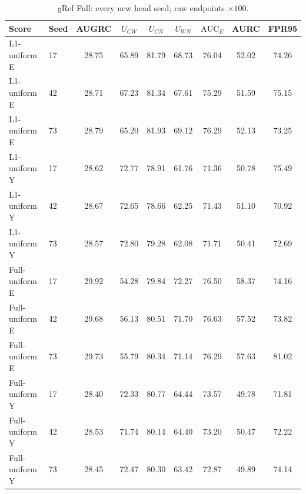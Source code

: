 \begin{table}[t]
\centering\footnotesize
\setlength{\tabcolsep}{3pt}
\renewcommand{\arraystretch}{1.15}
\caption{gRef Full: every new head seed; raw endpoints $\times100$.}\label{tab:coverage_seeds_gref_full}
\begin{tabular}{@{}llccccccc@{}}\toprule
Score & Seed & AUGRC & $U_{CW}$ & $U_{CN}$ & $U_{WN}$ & $\mathrm{AUC}_E$ & AURC & FPR95\\\midrule
L1-uniform E & 17 & 28.75 & 65.89 & 81.79 & 68.73 & 76.04 & 52.02 & 74.26\\
L1-uniform E & 42 & 28.71 & 67.23 & 81.34 & 67.61 & 75.29 & 51.59 & 75.15\\
L1-uniform E & 73 & 28.79 & 65.20 & 81.93 & 69.12 & 76.29 & 52.13 & 73.25\\
L1-uniform Y & 17 & 28.62 & 72.77 & 78.91 & 61.76 & 71.36 & 50.78 & 75.49\\
L1-uniform Y & 42 & 28.67 & 72.65 & 78.66 & 62.25 & 71.43 & 51.10 & 70.92\\
L1-uniform Y & 73 & 28.57 & 72.80 & 79.28 & 62.08 & 71.71 & 50.41 & 72.69\\
Full-uniform E & 17 & 29.92 & 54.28 & 79.84 & 72.27 & 76.50 & 58.37 & 74.16\\
Full-uniform E & 42 & 29.68 & 56.13 & 80.51 & 71.70 & 76.63 & 57.52 & 73.82\\
Full-uniform E & 73 & 29.73 & 55.79 & 80.34 & 71.14 & 76.29 & 57.63 & 81.02\\
Full-uniform Y & 17 & 28.40 & 72.33 & 80.77 & 64.44 & 73.57 & 49.78 & 71.81\\
Full-uniform Y & 42 & 28.53 & 71.74 & 80.14 & 64.40 & 73.20 & 50.47 & 72.22\\
Full-uniform Y & 73 & 28.45 & 72.47 & 80.30 & 63.42 & 72.87 & 49.89 & 74.14\\
\bottomrule\end{tabular}
\end{table}
